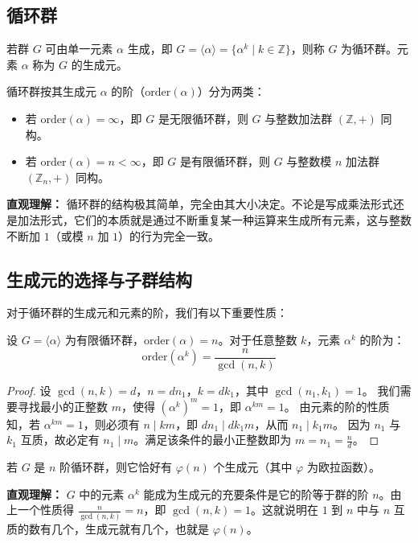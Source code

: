 \documentclass[11pt]{article}
\begin{document}
\subsection{循环群}

\begin{cndefinition}[循环群]
若群 $G$ 可由单一元素 $\alpha$ 生成，即 $G = \langle \alpha \rangle = \{ \alpha^k \mid k \in \mathbb{Z} \}$，则称 $G$ 为循环群。元素 $\alpha$ 称为 $G$ 的生成元。
\end{cndefinition}

\begin{cnproperty}[循环群的同构性质]
循环群按其生成元 $\alpha$ 的阶（$\mathrm{order}(\alpha)$）分为两类：
\begin{itemize}
    \item 若 $\mathrm{order}(\alpha) = \infty$，即 $G$ 是无限循环群，则 $G$ 与整数加法群 $(\mathbb{Z}, +)$ 同构。
    \item 若 $\mathrm{order}(\alpha) = n < \infty$，即 $G$ 是有限循环群，则 $G$ 与整数模 $n$ 加法群 $(\mathbb{Z}_n, +)$ 同构。
\end{itemize}
\end{cnproperty}
\textbf{直观理解：} 循环群的结构极其简单，完全由其大小决定。不论是写成乘法形式还是加法形式，它们的本质就是通过不断重复某一种运算来生成所有元素，这与整数不断加 $1$（或模 $n$ 加 $1$）的行为完全一致。

\subsection{生成元的选择与子群结构}

对于循环群的生成元和元素的阶，我们有以下重要性质：

\begin{cnproperty}[循环群中元素的阶]
设 $G = \langle \alpha \rangle$ 为有限循环群，$\mathrm{order}(\alpha) = n$。对于任意整数 $k$，元素 $\alpha^k$ 的阶为：
$$ \mathrm{order}(\alpha^k) = \frac{n}{\gcd(n, k)} $$
\end{cnproperty}
\begin{proof}
设 $\gcd(n, k) = d$，$n = d n_1$，$k = d k_1$，其中 $\gcd(n_1, k_1) = 1$。
我们需要寻找最小的正整数 $m$，使得 $(\alpha^k)^m = 1$，即 $\alpha^{km} = 1$。
由元素的阶的性质知，若 $\alpha^{km} = 1$，则必须有 $n \mid km$，即 $d n_1 \mid d k_1 m$，从而 $n_1 \mid k_1 m$。
因为 $n_1$ 与 $k_1$ 互质，故必定有 $n_1 \mid m$。满足该条件的最小正整数即为 $m = n_1 = \frac{n}{d}$。
\end{proof}

\begin{cncorollary}[生成元的个数]
若 $G$ 是 $n$ 阶循环群，则它恰好有 $\varphi(n)$ 个生成元（其中 $\varphi$ 为欧拉函数）。
\end{cncorollary}
\textbf{直观理解：} $G$ 中的元素 $\alpha^k$ 能成为生成元的充要条件是它的阶等于群的阶 $n$。由上一个性质得 $\frac{n}{\gcd(n, k)} = n$，即 $\gcd(n, k) = 1$。这就说明在 $1$ 到 $n$ 中与 $n$ 互质的数有几个，生成元就有几个，也就是 $\varphi(n)$。
\end{document}
